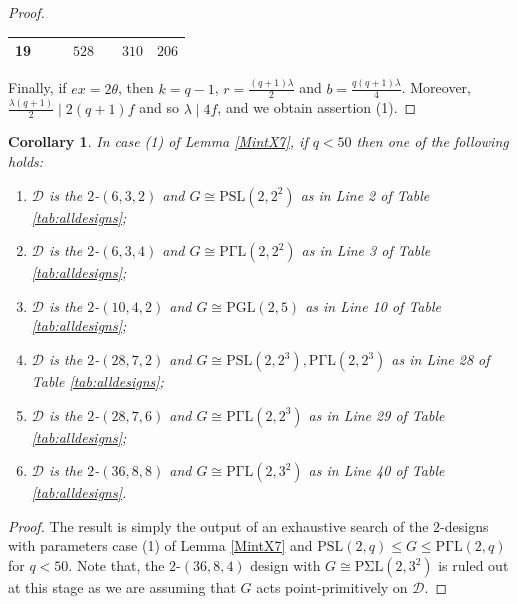 \documentclass[a4paper,twopage,reqno,12pt]{amsart}
\newtheorem{corollary}[theorem]{Corollary}
\theoremstyle{definition}
\numberwithin{equation}{section}
\newcommand{\PSL}{\mathrm{PSL}}
\newcommand{\PGL}{\mathrm{PGL}}
\newcommand{\PGaL}{\mathrm{P\Gamma L}}
\newcommand{\PSigL}{\mathrm{P\Sigma L}}
\renewcommand{\leq}{\leqslant}
\begin{document}
\begin{proof}
\begin{table}[htbp]
\begin{tabular}{ccccccc}
       19 &  &  & $528$ &  & $310$ & $206$ \\
        \bottomrule
    \end{tabular}
\end{table}
\normalsize



Finally, if $ex=2\theta $, then $k=q-1$, $r=\frac{(q+1)\lambda}{2}$ and $b=\frac{q(q+1)\lambda}{4}$. Moreover, $\frac{\lambda (q+1)}{2}\mid 2(q+1)f$ and so $\lambda
\mid 4f$, and we obtain assertion (1).
\end{proof}

\begin{corollary}\label{MintX7Cor} In case (1) of Lemma \ref{MintX7}, if $q<50$ then one of the following holds:
\begin{enumerate}
    \item $\mathcal{D}$ is the $2$-$(6,3,2)$ and $G\cong \PSL(2,2^{2})$ as in Line 2 of Table \ref{tab:alldesigns};
    \item $\mathcal{D}$ is the $2$-$(6,3,4)$ and $G\cong \PGaL(2,2^{2})$ as in Line 3 of Table \ref{tab:alldesigns};
    \item $\mathcal{D}$ is the $2$-$(10,4,2)$ and $G\cong \PGL(2,5)$ as in Line 10 of Table \ref{tab:alldesigns};
    \item $\mathcal{D}$ is the $2$-$(28,7,2)$ and $G\cong \PSL(2,2^{3}),\PGaL(2,2^{3})$ as in Line 28 of Table \ref{tab:alldesigns};
    \item $\mathcal{D}$ is the $2$-$(28,7,6)$ and $G\cong \PGaL(2,2^{3})$ as in Line 29 of Table \ref{tab:alldesigns};
    \item $\mathcal{D}$ is the $2$-$(36,8,8)$ and $G\cong \PGaL(2,3^{2})$ as in Line 40 of Table \ref{tab:alldesigns}.
\end{enumerate}    
\end{corollary}
\begin{proof}
The result is simply the output of an exhaustive search of the $2$-designs with parameters case (1) of Lemma \ref{MintX7} and $\PSL(2,q)\leq G \leq \PGaL(2,q)$ for $q<50$. Note that, the $2$-$(36,8,4)$ design with $G\cong \PSigL(2,3^{2})$ is ruled out at this stage as we are assuming that $G$ acts point-primitively on $\mathcal{D}$.       
\end{proof}
\end{document}

